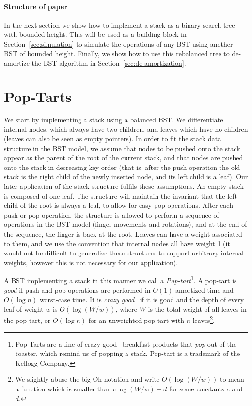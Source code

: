 \documentclass[11pt]{article}
\begin{document}
\paragraph{Structure of paper}

In the next section we show how to implement a stack as a binary
search tree with bounded height. This will be used as a building block
in Section~\ref{sec:simulation} to simulate the operations of any BST
using another BST of bounded height. Finally, we show how to use this
rebalanced tree to de-amortize the BST algorithm in Section~\ref{sec:de-amortization}.

\section{Pop-Tarts}

We start by implementing a stack using a balanced BST. We differentiate
internal nodes, which always have two children, and leaves which have no
children (leaves can also be seen as empty pointers). In order to fit
the stack data structure in the BST model, we assume that nodes to be
pushed onto the stack appear as the parent of the root of the current
stack, and that nodes are pushed onto the stack in decreasing key order
(that is, after the push operation the old stack is the right child of
the newly inserted node, and its left child is a leaf). Our later
application of the stack structure fulfils these assumptions. An empty
stack is composed of one leaf.  The structure will maintain the
invariant that the left child of the root is always a leaf, to allow for
easy pop operations. After each push or pop operation, the structure is
allowed to perform a sequence of operations in the BST model (finger
movements and rotations), and at the end of the sequence, the finger is
back at the root. Leaves can have a weight associated to them, and we
use the convention that internal nodes all have weight 1 (it would not
be difficult to generalize these structures to support arbitrary
internal weights, however this is not necessary for our application).

A BST implementing a stack in this manner we call a
\emph{Pop-tart}\footnote{Pop-Tarts are a line of crazy good~\cite{crazygood} breakfast products that {\em pop} out of the toaster, which remind us of popping a stack. Pop-tart is a trademark of the Kellogg
Company.}. A pop-tart is \emph{good} if push and pop operations are
performed in $O(1)$ amortized time and $O(\log n)$ worst-case time.  It
is \emph{crazy good}~\cite{crazygood} if it is good and the depth of every leaf of weight
$w$ is $O(\log (W/w))$, where $W$ is the
total weight of all leaves in the pop-tart, or $O(\log n)$ for an
unweighted pop-tart with $n$ leaves\footnote{We slightly abuse the big-Oh notation and write
$O(\log(W/w))$ to mean a function which is smaller than $c\log(W/w)+d$
for some constants $c$ and $d$.}.
\end{document}
